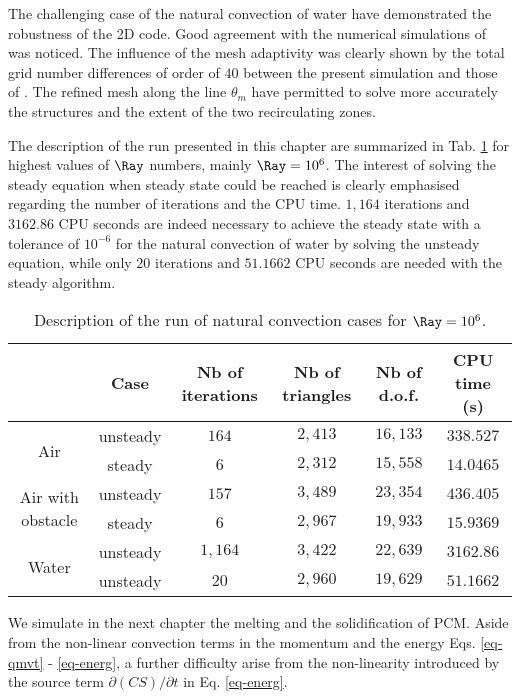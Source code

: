 \noindent The challenging case of the natural convection of water have demonstrated the robustness of the 2D code. 
Good agreement with the numerical simulations of \cite{Kowalewski-2003} was noticed. 
The influence of the mesh adaptivity was clearly shown by the total grid number differences of order of $40$ between the present simulation and those of \cite{Kowalewski-2003} .
The refined mesh along the line $\theta_m$ have permitted to solve more accurately the structures and the extent of the two recirculating zones.

The description of the run presented in this chapter are summarized in Tab. \ref{tab-natconv-cases} for highest values of $\Ray$ numbers, mainly $\Ray = 10^6$.
The interest of solving the steady equation when steady state could be reached is clearly emphasised regarding the number of iterations and the CPU time.
$1,164$ iterations and $3162.86$ CPU seconds are indeed necessary to achieve the steady state with a tolerance of $10^{-6}$ for the natural convection of water by solving the unsteady equation,
while only $20$ iterations and $51.1662$ CPU seconds are needed with the steady algorithm.

\begin{table}[!h]
\centering
\begin{tabular}{*{6}{c}}
  & Case & {\small Nb of iterations} & {\small Nb of triangles} & {\small Nb of d.o.f.} & {\small CPU time (s)}   \\
  \toprule 
  \multirow{2}{*}{Air} & unsteady & $164$ & $2,413$ & $16,133$ & $338.527$ \\
   & steady & $6$ & $2,312$ & $15,558$ & $14.0465$ \\
  \hline
  \multirow{2}{*}{Air with obstacle} & unsteady & $157$ & $3,489$ & $23,354$ & $436.405$ \\
  & steady & $6$ & $2,967$ & $19,933$ & $15.9369$ \\
  \hline
  \multirow{2}{*}{Water} & unsteady & $1,164$ & $3,422$ & $22,639$ & $3162.86$ \\
   & unsteady & $20$ & $2,960$ & $19,629$ & $51.1662$ \\

\bottomrule
 \end{tabular}
\caption{Description of the run of natural convection cases for $\Ray = 10^6$.}
\label{tab-natconv-cases}
\end{table}

We simulate in the next chapter the melting and the solidification of PCM.
Aside from the non-linear convection terms in the momentum and the energy Eqs. \ref{eq-qmvt} - \ref{eq-energ}, a further difficulty arise from the non-linearity introduced by the source term $\partial (CS)/\partial t$ in Eq. \ref{eq-energ}.
